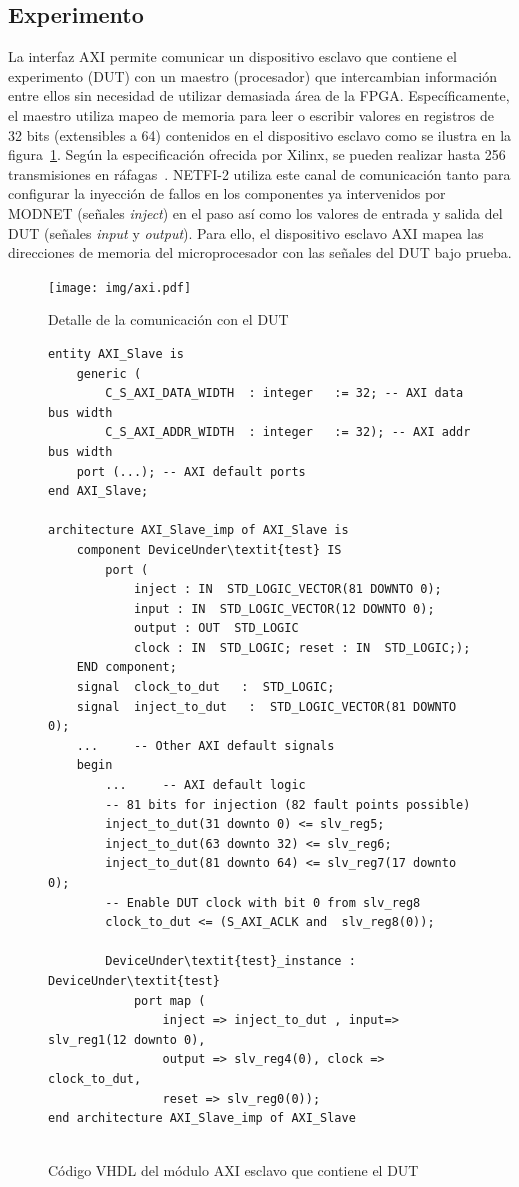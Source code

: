 \documentclass[a4paper,openright,12pt]{report}
\newcommand*\circled[1]{\tikz[baseline=(char.base)]{
            \node[shape=circle,draw,inner sep=0.7pt] (char) {#1};}}
\begin{document}
\subsection{Experimento}

La interfaz AXI permite comunicar un dispositivo esclavo que contiene el experimento (DUT) con un maestro (procesador) que intercambian información entre ellos sin necesidad de utilizar demasiada área de la FPGA. Específicamente, el maestro utiliza mapeo de memoria para leer o escribir valores en registros de 32 bits (extensibles a 64) contenidos en el dispositivo esclavo como se ilustra en la figura~\ref{axi}. Según la especificación ofrecida por Xilinx, se pueden realizar hasta 256 transmisiones en ráfagas~\cite{AXI}. NETFI-2 utiliza este canal de comunicación tanto para configurar la inyección de fallos en los componentes ya intervenidos por MODNET (señales \emph{inject}) en el paso \circled{2} así como los valores de entrada y salida del DUT (señales \emph{input} y \emph{output}). Para ello, el dispositivo esclavo AXI mapea las direcciones de memoria del microprocesador con las señales del DUT bajo prueba.

\begin{figure}[H]
	\centering
	\texttt{[image: img/axi.pdf]}
	\caption{Detalle de la comunicación con el DUT}
	\label{axi}
\end{figure}

\lstset{frame=tb,
  language=VHDL,
  aboveskip=3mm,
  belowskip=3mm,
  showstringspaces=false,
  columns=flexible,
  basicstyle=\ttfamily,
  numbers=none,
  breakatwhitespace=true,
  tabsize=2
}

\begin{figure}[H]
\centering
\begin{lstlisting}
entity AXI_Slave is 
	generic (
		C_S_AXI_DATA_WIDTH	: integer	:= 32; -- AXI data bus width
		C_S_AXI_ADDR_WIDTH	: integer	:= 32); -- AXI addr bus width
	port (...); -- AXI default ports
end AXI_Slave;

architecture AXI_Slave_imp of AXI_Slave is
	component DeviceUnder\textit{test} IS
		port (
			inject : IN  STD_LOGIC_VECTOR(81 DOWNTO 0);
			input : IN  STD_LOGIC_VECTOR(12 DOWNTO 0);
			output : OUT  STD_LOGIC
			clock : IN  STD_LOGIC; reset : IN  STD_LOGIC;);
	END component;
	signal  clock_to_dut   :  STD_LOGIC;
	signal  inject_to_dut   :  STD_LOGIC_VECTOR(81 DOWNTO 0);
	... 	-- Other AXI default signals
	begin
		... 	-- AXI default logic
		-- 81 bits for injection (82 fault points possible)
		inject_to_dut(31 downto 0) <= slv_reg5;
		inject_to_dut(63 downto 32) <= slv_reg6;
		inject_to_dut(81 downto 64) <= slv_reg7(17 downto 0);
		-- Enable DUT clock with bit 0 from slv_reg8
		clock_to_dut <= (S_AXI_ACLK and  slv_reg8(0)); 
		
		DeviceUnder\textit{test}_instance : DeviceUnder\textit{test}	
			port map (
				inject => inject_to_dut , input=>  slv_reg1(12 downto 0), 
				output => slv_reg4(0), clock => clock_to_dut, 
				reset => slv_reg0(0));			
end architecture AXI_Slave_imp of AXI_Slave
		
\end{lstlisting}
	\caption{Código VHDL del módulo AXI esclavo que contiene el DUT}
	\label{axi_slave}
\end{figure}
\end{document}

